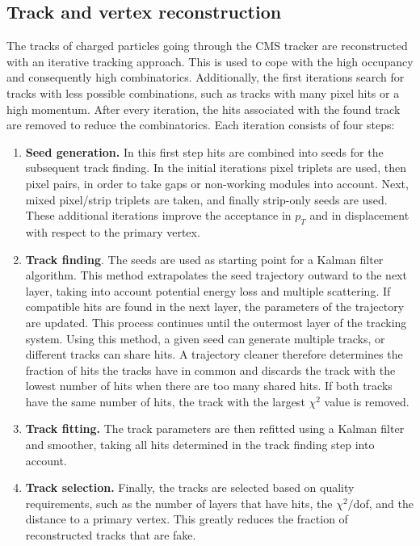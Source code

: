 \subsection{Track and vertex reconstruction}
\label{sec:tracking}

The tracks of charged particles going through the \ac{CMS} tracker are reconstructed with an iterative tracking approach. This is used to cope with the high occupancy and consequently high combinatorics. Additionally, the first iterations search for tracks with less possible combinations, such as tracks with many pixel hits or a high momentum. After every iteration, the hits associated with the found track are removed to reduce the combinatorics. Each iteration consists of four steps:
\begin{enumerate}
 \item \textbf{Seed generation.} In this first step hits are combined into seeds for the subsequent track finding. In the initial iterations pixel triplets are used, then pixel pairs, in order to take gaps or non-working modules into account. Next, mixed pixel/strip triplets are taken, and finally strip-only seeds are used. These additional iterations improve the acceptance in $p_T$ and in displacement with respect to the primary vertex.
 \item \textbf{Track finding}. The seeds are used as starting point for a Kalman filter algorithm. This method extrapolates the seed trajectory outward to the next layer, taking into account potential energy loss and multiple scattering. If compatible hits are found in the next layer, the parameters of the trajectory are updated. This process continues until the outermost layer of the tracking system. Using this method, a given seed can generate multiple tracks, or different tracks can share hits. A trajectory cleaner therefore determines the fraction of hits the tracks have in common and discards the track with the lowest number of hits when there are too many shared hits. If both tracks have the same number of hits, the track with the largest $\chi^2$ value is removed.
 \item \textbf{Track fitting.} The track parameters are then refitted using a Kalman filter and smoother, taking all hits determined in the track finding step into account.
 \item \textbf{Track selection.} Finally, the tracks are selected based on quality requirements, such as the number of layers that have hits, the $\chi^2/$dof, and the distance to a primary vertex. This greatly reduces the fraction of reconstructed tracks that are fake.
\end{enumerate}


